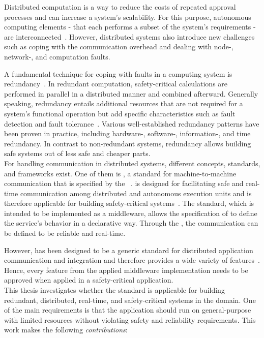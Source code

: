 \noindent
Distributed computation is a way to reduce the costs of repeated approval processes and can increase a system's scalability.
For this purpose, autonomous computing elements - that each performs a subset of the system's requirements - are interconnected~\cite{DistributedSafety2020}.
However, distributed systems also introduce new challenges such as coping with the communication overhead and dealing with node-, network-, and computation faults.

A fundamental technique for coping with faults in a computing system is redundancy~\cite{TanenbaumSteen07}.
In redundant computation, safety-critical calculations are performed in parallel in a distributed manner and combined afterward.
Generally speaking, redundancy entails additional resources that are not required for a system's functional operation but add specific characteristics such as fault detection and fault tolerance~\cite{BarryFaultToleranceAnalysis}.
Various well-established redundancy patterns have been proven in practice, including hardware-, software-, information-, and time redundancy.
In contrast to non-redundant systems, redundancy allows building safe systems out of less safe and cheaper parts.
\\

\noindent
For handling communication in distributed systems, different concepts, standards, and frameworks exist.
One of them is , a  standard for machine-to-machine communication that is specified by the ~\cite{omgDDSspec}.
 is designed for facilitating safe and real-time communication among distributed and autonomous execution units and is therefore applicable for building safety-critical systems~\cite{DistributedSafety2020}.
The standard, which is intended to be implemented as a middleware, allows the specification of  to define the service's behavior in a declarative way.
Through the , the communication can be defined to be reliable and real-time.

However,  has been designed to be a generic standard for distributed application communication and integration and therefore provides a wide variety of features~\cite{omgDDSspec}.
Hence, every feature from the applied middleware implementation needs to be approved when applied in a safety-critical application.
\\

\noindent
This thesis investigates whether the  standard is applicable for building redundant, distributed, real-time, and safety-critical systems in the  domain.
One of the main requirements is that the application should run on general-purpose  with limited resources without violating safety and reliability requirements.
This work makes the following \textit{contributions}:


